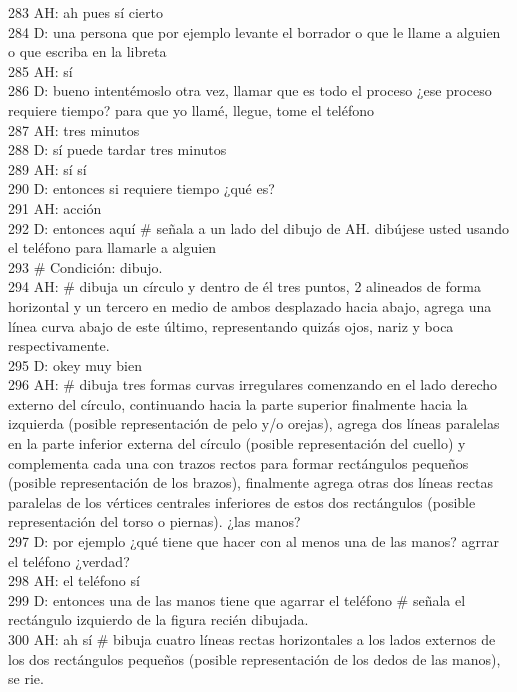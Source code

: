 283 AH: ah pues sí cierto\\
284 D: una persona que por ejemplo levante el borrador o que le llame a alguien o que escriba en la libreta\\
285 AH: sí\\
286 D: bueno intentémoslo otra vez, llamar que es todo el proceso ¿ese proceso requiere tiempo? para que yo llamé, llegue, tome el teléfono\\
287 AH: tres minutos\\
288 D: sí puede tardar tres minutos\\
289 AH: sí sí\\
290 D: entonces si requiere tiempo ¿qué es?\\
291 AH: acción\\
292 D: entonces aquí \# señala a un lado del dibujo de AH. dibújese usted usando el teléfono para llamarle a alguien\\
293 \# Condición: dibujo.\\
294 AH: \# dibuja un círculo y dentro de él tres puntos, 2 alineados de forma horizontal y un tercero en medio de ambos desplazado hacia abajo, agrega una línea curva abajo de este último, representando quizás ojos, nariz y boca respectivamente.\\
295 D: okey muy bien\\
296 AH: \# dibuja tres formas curvas irregulares comenzando en el lado derecho externo del círculo, continuando hacia la parte superior  finalmente hacia la izquierda (posible representación de pelo y/o orejas), agrega dos líneas paralelas en la parte inferior externa del círculo (posible representación del cuello) y complementa cada una con trazos rectos para formar rectángulos pequeños (posible representación de los brazos), finalmente agrega otras dos líneas rectas paralelas de los vértices centrales inferiores de estos dos rectángulos (posible representación del torso o piernas). ¿las manos?\\
297 D: por ejemplo ¿qué tiene que hacer con al menos una de las manos? agrrar el teléfono ¿verdad?\\
298 AH: el teléfono sí\\
299 D: entonces una de las manos tiene que agarrar el teléfono \# señala el rectángulo izquierdo de la figura recién dibujada.\\
300 AH: ah sí \# bibuja cuatro líneas rectas horizontales a los lados externos de los dos rectángulos pequeños (posible representación de los dedos de las manos), se rie.\\
